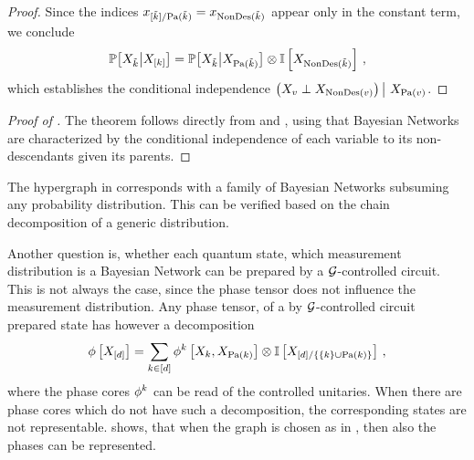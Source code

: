 \begin{proof}
    Since the indices $x_{[\tilde{k}]/\mathrm{Pa}(\tilde{k})} = x_{\mathrm{NonDes}(\tilde{k})}$ appear only in the constant term, we conclude
    \begin{align*}
        \mathbb{P}\big[X_{\tilde{k}}\big|X_{[k]}\big] = \mathbb{P}\big[X_{\tilde{k}}\big|X_{\mathrm{Pa}(\tilde{k})}\big] \otimes \mathbb{I}\left[X_{\mathrm{NonDes}(\tilde{k})}\right]\, ,
    \end{align*}
    which establishes the conditional independence $\left(X_{v}\perp X_{\mathrm{NonDes}(v)}\middle)\,\right|\,X_{\mathrm{Pa}(v)}$.
\end{proof}

\begin{proof}[Proof of ]
    The theorem follows directly from  and , using that Bayesian Networks are characterized by the conditional independence of each variable to its non-descendants given its parents.
\end{proof}

\begin{example}
    The hypergraph in  corresponds with a family of Bayesian Networks subsuming any probability distribution.
    This can be verified based on the chain decomposition of a generic distribution.
\end{example}

Another question is, whether each quantum state, which measurement distribution is a Bayesian Network can be prepared by a $\mathcal{G}$-controlled circuit.
This is not always the case, since the phase tensor does not influence the measurement distribution.
Any phase tensor, of a by $\mathcal{G}$-controlled circuit prepared state has however a decomposition
\begin{align*}
    \phi\left[X_{[d]}\right]
    = \sum_{k\in[d]} \phi^{k}\left[X_{k},X_{\mathrm{Pa}(k)}\right] \otimes \mathbb{I}\left[X_{[d]/\{\{k\}\cup\mathrm{Pa}(k)\}}\right] \, ,
\end{align*}
where the phase cores $\phi^{k}$ can be read of the controlled unitaries.
When there are phase cores which do not have such a decomposition, the corresponding states are not representable.
\cite{mottonen_transformation_2005} shows, that when the graph is chosen as in , then also the phases can be represented.


